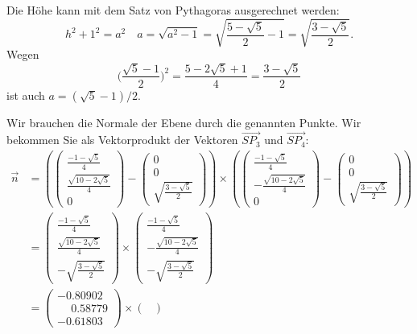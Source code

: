 \begin{loesung}
\begin{teilaufgaben}
\item Die Höhe kann mit dem Satz von Pythagoras ausgerechnet werden:
\[
h^2+1^2=a^2\quad a=\sqrt{a^2-1}
=
\sqrt{\frac{5-\sqrt{5}}2-1}
=
\sqrt{\frac{3-\sqrt{5}}2}.
\]
Wegen 
\[
\biggl(\frac{\sqrt{5}-1}2\biggr)^2=\frac{5-2\sqrt{5}+1}{4}=\frac{3-\sqrt{5}}2
\]
ist auch $a=(\sqrt{5}-1)/2$.
\item
Wir brauchen die Normale der Ebene durch die genannten Punkte.
Wir bekommen Sie als Vektorprodukt der Vektoren
$\overrightarrow{SP_3}$
und
$\overrightarrow{SP_4}$:
\begin{align*}
\vec n
&=
\left(
\begin{pmatrix}
\frac{-1-\sqrt{5}}4\\
\frac{\sqrt{10-2\sqrt{5}}}4\\
0
\end{pmatrix}
-
\begin{pmatrix}
0\\0\\\sqrt{\frac{3-\sqrt{5}}2}
\end{pmatrix}
\right)
\times
\left(
\begin{pmatrix}
\frac{-1-\sqrt{5}}4\\
-\frac{\sqrt{10-2\sqrt{5}}}4\\
0
\end{pmatrix}
-
\begin{pmatrix}
0\\0\\\sqrt{\frac{3-\sqrt{5}}2}
\end{pmatrix}
\right)
\\
&=
\begin{pmatrix}
\frac{-1-\sqrt{5}}4\\
\frac{\sqrt{10-2\sqrt{5}}}4\\
-\sqrt{\frac{3-\sqrt{5}}2}
\end{pmatrix}
\times
\begin{pmatrix}
\frac{-1-\sqrt{5}}4\\
-\frac{\sqrt{10-2\sqrt{5}}}4\\
-\sqrt{\frac{3-\sqrt{5}}2}
\end{pmatrix}
\\
&=\begin{pmatrix}
  -0.80902\\
  \phantom{-}0.58779\\
  -0.61803   
\end{pmatrix}
\times
\begin{pmatrix}

\end{pmatrix}
\end{align*}
\end{teilaufgaben}
\end{loesung}

